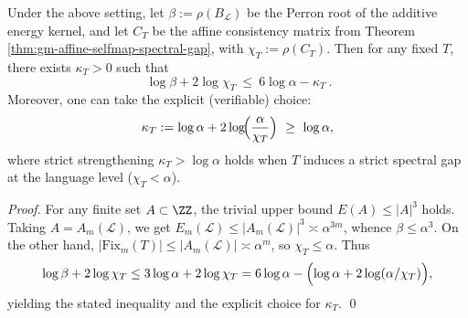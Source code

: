 \begin{proposition}\label{prop:gm-energy-affine-complementarity}
Under the above setting, let \(\beta:=\rho(B_{\mathcal{L}})\) be the Perron root of the additive energy kernel, and let \(C_T\) be the affine consistency matrix from Theorem \ref{thm:gm-affine-selfmap-spectral-gap}, with \(\chi_T:=\rho(C_T)\).
Then for any fixed \(T\), there exists \(\kappa_T>0\) such that
\[
\boxed{\ \log\beta+2\log\chi_T\ \le\ 6\log\alpha-\kappa_T\ }.
\]
Moreover, one can take the explicit (verifiable) choice:
\[
\kappa_T:=\log\alpha+2\log\!\Bigl(\frac{\alpha}{\chi_T}\Bigr)\ \ge\ \log\alpha,
\]
where strict strengthening \(\kappa_T>\log\alpha\) holds when \(T\) induces a strict spectral gap at the language level (\(\chi_T<\alpha\)).
\end{proposition}

\begin{proof}
For any finite set \(A\subset\ZZ\), the trivial upper bound \(E(A)\le |A|^3\) holds.
Taking \(A=A_m(\mathcal{L})\), we get \(E_m(\mathcal{L})\le |A_m(\mathcal{L})|^3\asymp \alpha^{3m}\), whence \(\beta\le \alpha^3\).
On the other hand, \(|\mathrm{Fix}_m(T)|\le |A_m(\mathcal{L})|\asymp \alpha^m\), so \(\chi_T\le \alpha\).
Thus
\[
\log\beta+2\log\chi_T
\le 3\log\alpha+2\log\chi_T
=6\log\alpha-\Bigl(\log\alpha+2\log(\alpha/\chi_T)\Bigr),
\]
yielding the stated inequality and the explicit choice for \(\kappa_T\). \qed
\end{proof}

